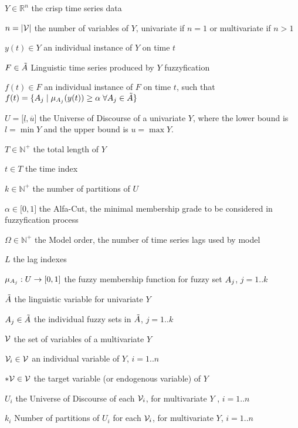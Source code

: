 
\begin{simbolos}

\item[$Y \in \mathbb{R}^n$]  the crisp time series data 
\item[$n = |\mathcal{V}|$] the number of variables of $Y$, univariate if $n=1$ or multivariate if $n > 1$
\item[$y(t) \in Y$] an individual instance of $Y$ on time $t$
\item[$F \in \tilde{A}$] Linguistic time series produced by $Y$ fuzzyfication 
\item[$f(t) \in F$] an individual instance of $F$ on time $t$, such that $f(t) = \{ A_j\;|\; \mu_{A_j}(y(t)) \geq \alpha\; \forall A_j \in \tilde{A} \}$
\item[$U = [\underline{l},\overline{u}{]}$] the Universe of Discourse of a univariate $Y$, where the lower bound is $l = \min Y$ and the upper bound is $u = \max Y$.
\item[$T \in \mathbb{N}^+$] the total length of $Y$
\item[$t \in T$]  the time index
\item[$k \in \mathbb{N}^+$] the number of partitions of $U$
\item[$\alpha \in [0,1{]}$] the Alfa-Cut, the minimal membership grade to be considered in fuzzyfication process
\item[$\Omega \in \mathbb{N}^+$] the Model order, the number of time series lags used by model
\item[$L$] the lag indexes
\item[$\mu_{A_j}: U \rightarrow [0,1{]}$] the fuzzy membership function for fuzzy set $A_j$, $j = 1..k$ 
\item[$\tilde{A}$] the linguistic variable for univariate $Y$
\item[$A_j \in \tilde{A}$] the individual fuzzy sets in $\tilde{A}$, $j = 1..k$
\item[$\mathcal{V}$] the set of variables of a multivariate $Y$
\item[$\mathcal{V}_i \in \mathcal{V}$] an individual variable of $Y$, $i = 1..n$
\item[$*\mathcal{V} \in \mathcal{V}$] the target variable (or endogenous variable) of $Y$ 
\item[$U_i$]  the Universe of Discourse of each  $\mathcal{V}_i$, for multivariate $Y$ , $i = 1..n$
\item[$k_i$] Number of partitions of $U_i$ for each  $\mathcal{V}_i$, for multivariate $Y$, $i = 1..n$

\end{simbolos}
